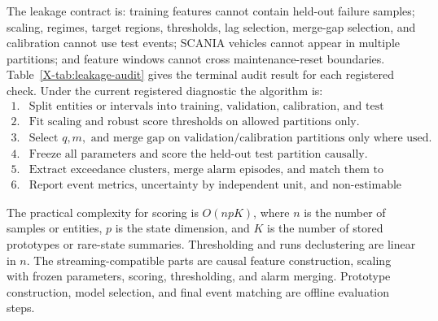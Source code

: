 The leakage contract is: training features cannot contain held-out failure samples; scaling, regimes, target regions, thresholds, lag selection, merge-gap selection, and calibration cannot use test events; SCANIA vehicles cannot appear in multiple partitions; and feature windows cannot cross maintenance-reset boundaries. Table~\ref{X-tab:leakage-audit} gives the terminal audit result for each registered check. Under the current registered diagnostic the algorithm is:
\[
\begin{array}{ll}
1. & \text{Split entities or intervals into training, validation, calibration, and test partitions.}\\
2. & \text{Fit scaling and robust score thresholds on allowed partitions only.}\\
3. & \text{Select } q,m,\text{ and merge gap on validation/calibration partitions only where used.}\\
4. & \text{Freeze all parameters and score the held-out test partition causally.}\\
5. & \text{Extract exceedance clusters, merge alarm episodes, and match them to labelled events.}\\
6. & \text{Report event metrics, uncertainty by independent unit, and non-estimable cases.}
\end{array}
\]


The practical complexity for scoring is \(O(npK)\), where \(n\) is the number of samples or entities, \(p\) is the state dimension, and \(K\) is the number of stored prototypes or rare-state summaries. Thresholding and runs declustering are linear in \(n\). The streaming-compatible parts are causal feature construction, scaling with frozen parameters, scoring, thresholding, and alarm merging. Prototype construction, model selection, and final event matching are offline evaluation steps.
